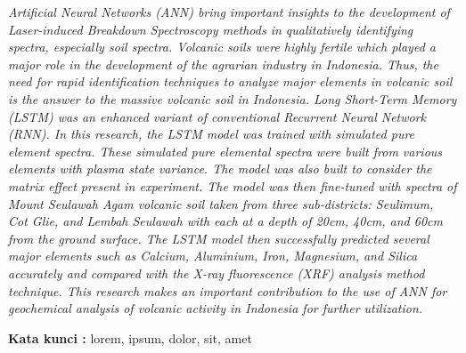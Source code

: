 \begin{abstracteng}
\textit{Artificial Neural Networks (ANN) bring important insights to the development of Laser-induced Breakdown Spectroscopy methods in qualitatively identifying spectra, especially soil spectra. Volcanic soils were highly fertile which played a major role in the development of the agrarian industry in Indonesia. Thus, the need for rapid identification techniques to analyze major elements in volcanic soil is the answer to the massive volcanic soil in Indonesia. Long Short-Term Memory (LSTM) was an enhanced variant of conventional Recurrent Neural Network (RNN). In this research, the LSTM model was trained with simulated pure element spectra. These simulated pure elemental spectra were built from various elements with plasma state variance. The model was also built to consider the matrix effect present in experiment. The model was then fine-tuned with spectra of Mount Seulawah Agam volcanic soil taken from three sub-districts: Seulimum, Cot Glie, and Lembah Seulawah with each at a depth of 20cm, 40cm, and 60cm from the ground surface. The LSTM model then successfully predicted several major elements such as Calcium, Aluminium, Iron, Magnesium, and Silica accurately and compared with the X-ray fluorescence (XRF) analysis method technique. This research makes an important contribution to the use of ANN for geochemical analysis of volcanic activity in Indonesia for further utilization.
}

\bigskip
\noindent
\textbf{Kata kunci :} lorem, ipsum, dolor, sit, amet
\end{abstracteng}